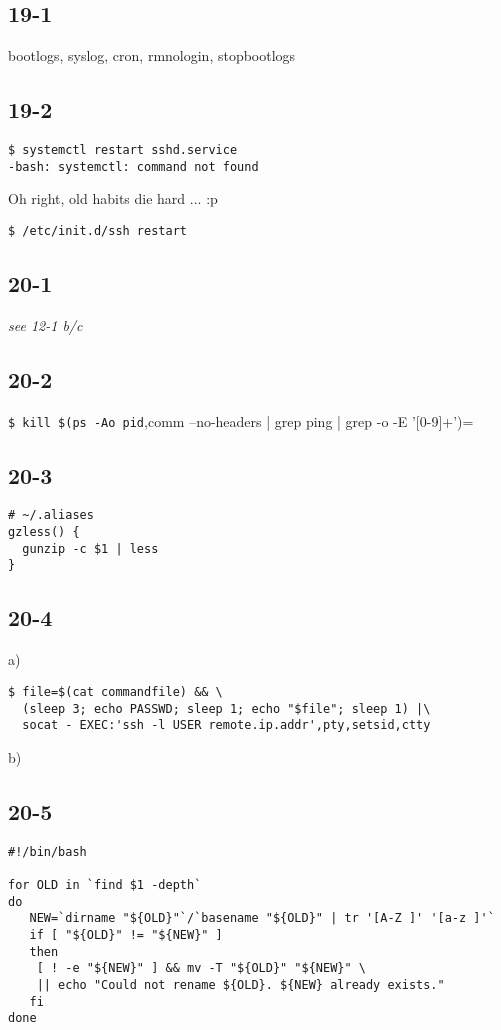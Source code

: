 \subsection{19-1}
bootlogs, syslog, cron, rmnologin, stopbootlogs

\subsection{19-2}
\begin{verbatim}
$ systemctl restart sshd.service
-bash: systemctl: command not found
\end{verbatim}

Oh right, old habits die hard ... :p

\verb=$ /etc/init.d/ssh restart=

\subsection{20-1}
\emph{see 12-1 b/c}

\subsection{20-2}
\verb=$ kill $(ps -Ao pid=,comm --no-headers | grep ping | grep -o -E '[0-9]+')=

\subsection{20-3}
\begin{verbatim}
# ~/.aliases
gzless() {
  gunzip -c $1 | less
}
\end{verbatim}
\subsection{20-4}
a)
\begin{verbatim}
$ file=$(cat commandfile) && \
  (sleep 3; echo PASSWD; sleep 1; echo "$file"; sleep 1) |\
  socat - EXEC:'ssh -l USER remote.ip.addr',pty,setsid,ctty
\end{verbatim}

b)

\subsection{20-5}
\begin{verbatim}
#!/bin/bash

for OLD in `find $1 -depth`
do
   NEW=`dirname "${OLD}"`/`basename "${OLD}" | tr '[A-Z ]' '[a-z ]'`
   if [ "${OLD}" != "${NEW}" ]
   then
	[ ! -e "${NEW}" ] && mv -T "${OLD}" "${NEW}" \
	|| echo "Could not rename ${OLD}. ${NEW} already exists."
   fi
done
\end{verbatim}

